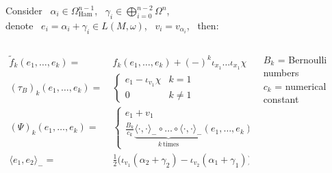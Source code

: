 \documentclass[beamer,handout,10pt]{standalone}
\begin{document}
\begin{frame}


		\begin{propblock}
			\centering
			\parbox{0.96\linewidth}{%
				Consider ~$\alpha_i \in \Omega_{\text{Ham}}^{n-1}$,
				~$\gamma_i \in \bigoplus_{i=0}^{n-2}\Omega^n$,
				\\
				denote ~$e_i = \alpha_i + \gamma_i \in L(M,\omega)$, 
				~$v_i = v_{\alpha_i}$,  ~then:
			}
			\begin{columns}[T]
				\begin{column}{.8\linewidth}
					\begin{displaymath}
						\begin{split}
							\tilde{f}_k(e_1,\dots,e_k) =&~
							f_k(e_1,\dots,e_k)  + (-)^k \iota_{x_1}\dots\iota_{x_1} \chi
							\\
							(\tau_B)_k (e_1,\dots,e_k) =&~
							\begin{cases}
								e_1 - \iota_{v_1} \chi & k=1 \\
								0	& k \neq 1
							\end{cases}
							\\
							(\Psi)_k (e_1,\dots,e_k) =&~
							\begin{cases}
								e_1 + v_1 & k=1 \\
								\frac{B_k}{c_k} 
							\underbrace{\langle\cdot,\cdot\rangle_-\circ\dots\circ\langle\cdot,\cdot\rangle_-}_{k ~\text{times}}(e_1,\dots,e_k)	& k \neq 1
							\end{cases}
							\\
							\langle e_1,e_2 \rangle_- =&~
							\frac{1}{2}\big(\iota_{v_1}(\alpha_2+\gamma_2)
							- \iota_{v_2}(\alpha_1+\gamma_1)\big)							
						\end{split}
					\end{displaymath}
				\end{column}
				\begin{column}{.2\linewidth}
					\vspace{5em}
					\small
					$B_k$ = Bernoulli numbers \\
					$c_k$ = numerical constant
				\end{column}			
			\end{columns}		
		\end{propblock}



\end{frame}









\end{document}
